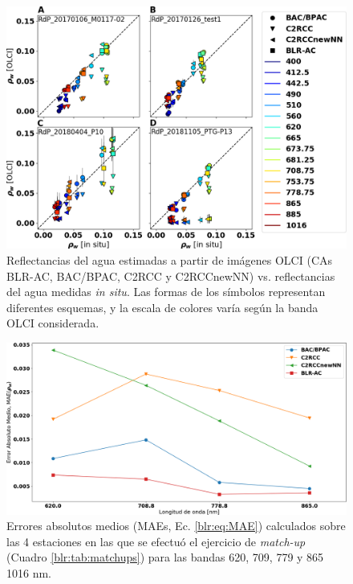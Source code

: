             \begin{figure}
            \centering
            \includegraphics[width=\textwidth]{blr/figures/matchups_rho_scatter.png}
            \caption[Reflectancias del agua estimadas a partir de imágenes OLCI (CAs BLR-AC, BAC/BPAC, C2RCC y C2RCCnewNN) vs. reflectancias del agua medidas \textit{in situ}.]{Reflectancias del agua estimadas a partir de imágenes OLCI (CAs BLR-AC, BAC/BPAC, C2RCC y C2RCCnewNN) vs. reflectancias del agua medidas \textit{in situ}. Las formas de los símbolos representan diferentes esquemas, y la escala de colores varía según la banda OLCI considerada.}
            \label{blr:matchups_rho_scatter}
            \end{figure}
            
            \begin{figure}
            \centering
            \includegraphics[width=\textwidth]{blr/figures/matchups_rho_MAE.png}
            \caption[Errores absolutos medios calculados sobre las 4 estaciones en las que se efectuó el ejercicio de \textit{match-up} para las bandas 620, 709, 779 y 865 1016 nm.]{Errores absolutos medios (MAEs, Ec. \ref{blr:eq:MAE}) calculados sobre las 4 estaciones en las que se efectuó el ejercicio de \textit{match-up} (Cuadro \ref{blr:tab:matchups}) para las bandas 620, 709, 779 y 865 1016 nm.}
            \label{blr:matchups_rho_MAE}
            \end{figure}
            
